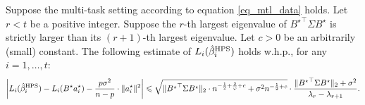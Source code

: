 \begin{theorem}\label{thm_many_tasks}
Suppose the multi-task setting according to equation \eqref{eq_mtl_data} holds.
Let $r < t$ be a positive integer.
Suppose the $r$-th largest eigenvalue of ${B^\star}^\top \Sigma B^\star$ is strictly larger than its $(r+1)$-th largest eigenvalue. 
Let $c>0$ be an arbitrarily (small) constant.
The following estimate of $L_i(\hat{\beta}_i^{\textup{HPS}})$ holds w.h.p., for any $i = 1,\dots,t$:
\begin{align}
	\bigabs{L_i(\hat{\beta}_i^{\MTL}) - L_i(B^{\star}a_i^{\star}) -\frac{p\sigma^2}{n-p} \cdot \norm{a_i^{\star}}^2} 
	\le  \sqrt{\norm{{B^\star}^\top\Sigma B^\star}_{2} \cdot n^{-\frac 1 2+ \frac 2{\varphi} + c}  + \sigma^2 n^{-\frac 1 2 + c}} \cdot \frac{\norm{{B^\star}^\top\Sigma B^\star}_{2}+  \sigma^2}{\lambda_r - \lambda_{r+1}}. \label{Li_multi1}
\end{align}
\end{theorem}


